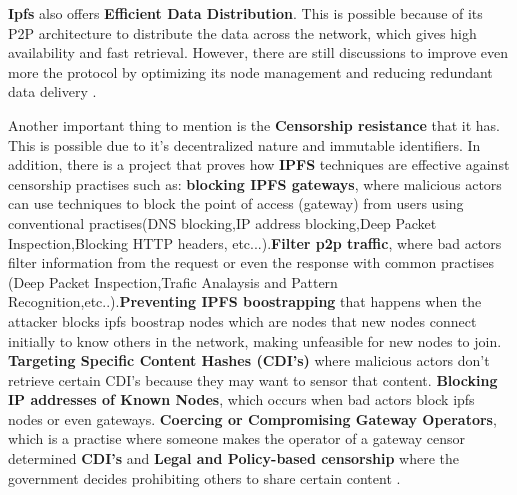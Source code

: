 \textbf{Ipfs} also offers \textbf{Efficient Data Distribution}. This is possible because of its P2P architecture to distribute the data across the network, which gives high availability and fast retrieval. However, there are still discussions to improve even more the protocol by optimizing its node management and reducing redundant data delivery \cite{ipfs-optimization}.

Another important thing to mention is the \textbf{Censorship resistance} that it has. This is possible due to it's decentralized nature and immutable identifiers. In addition, there is a project that proves how \textbf{IPFS} techniques are effective against censorship practises such as: \textbf{blocking IPFS gateways}, where malicious actors can use techniques to block the point of access (gateway) from users using conventional practises(DNS blocking,IP address blocking,Deep Packet Inspection,Blocking HTTP headers, etc...).\textbf{Filter p2p traffic}, where bad actors filter information from the request or even the response with common practises (Deep Packet Inspection,Trafic Analaysis and Pattern Recognition,etc..).\textbf{Preventing IPFS boostrapping} that happens when the attacker blocks ipfs boostrap nodes which are nodes that new nodes connect initially to know others in the network, making unfeasible for new nodes to join. \textbf{Targeting Specific Content Hashes (CDI's)} where malicious actors don't retrieve certain CDI's because they may want to sensor that content. \textbf{Blocking IP addresses of Known Nodes}, which occurs when bad actors block ipfs nodes or even gateways. \textbf{Coercing or Compromising Gateway Operators}, which is a practise where someone makes the operator of a gateway censor determined \textbf{CDI's} and \textbf{Legal and Policy-based censorship} where the government decides prohibiting others to share certain content \cite{censhorship-combat}.


